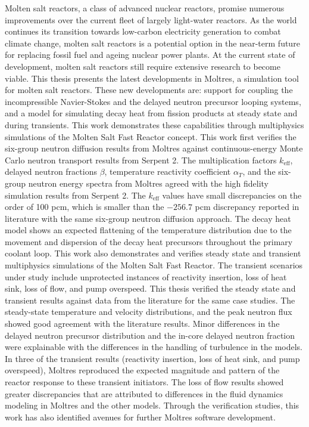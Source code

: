 Molten salt reactors, a class of advanced nuclear reactors, promise
numerous improvements over the current fleet of largely light-water reactors.
As the world continues its transition towards low-carbon electricity
generation to combat climate change, molten salt reactors is a potential
option in the near-term future for replacing fossil fuel and ageing nuclear
power plants. At the current state of development, molten salt reactors still
require extensive research to become viable. This thesis presents the latest
developments in Moltres, a simulation tool for molten salt reactors. These
new developments are: support for coupling the incompressible Navier-Stokes
and the delayed neutron precursor looping systems, and a model for
simulating decay heat from fission products at steady state and during
transients. This work demonstrates these capabilities through multiphysics
simulations of the Molten Salt Fast
Reactor concept. This work first verifies the six-group neutron diffusion
results from Moltres against continuous-energy Monte Carlo neutron transport
results from Serpent 2. The multiplication factors $k_{\text{eff}}$, delayed
neutron fractions $\beta$, temperature reactivity coefficient $\alpha_T$, and
the six-group neutron energy spectra from Moltres agreed with the high
fidelity simulation results from Serpent 2. The $k_{\text{eff}}$ values have
small discrepancies on the order of 100 pcm, which is smaller than the
$-256.7$ pcm discrepancy reported in literature with the same six-group
neutron diffusion approach. The decay heat model shows an expected flattening
of the temperature distribution due to the movement and dispersion of the
decay heat precursors throughout the primary coolant loop. This work also
demonstrates and verifies steady state and
transient multiphysics simulations of the Molten Salt Fast Reactor. The
transient scenarios under study include unprotected instances of reactivity
insertion, loss of heat sink, loss of flow, and pump overspeed. This thesis
verified the steady state and transient results against data from the
literature for the same case studies. The steady-state temperature and
velocity distributions, and the peak neutron flux showed good agreement with
the literature results. Minor differences in the delayed neutron precursor
distribution and the in-core delayed neutron fraction were explainable with
the differences in the handling of turbulence in the models. In three of the
transient results (reactivity insertion, loss of heat sink, and pump
overspeed), Moltres reproduced the expected magnitude and pattern of the
reactor response to these transient initiators.
The loss of flow results showed greater discrepancies that are attributed
to differences in the fluid dynamics modeling in Moltres and the other models.
Through the verification studies, this work has also identified avenues
for further Moltres software development.